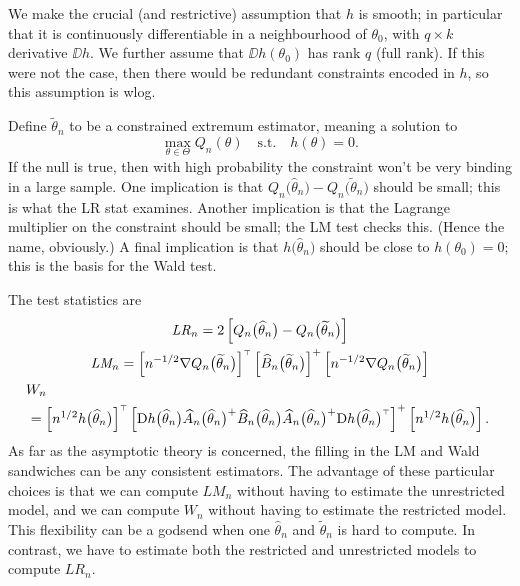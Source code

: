 \documentclass[11pt,letterpaper,reqno,oneside]{article}
\begin{document}
We make the crucial (and restrictive) assumption that $h$ is smooth; in particular that it is continuously differentiable in a neighbourhood of $\theta_0$, with $q \times k$ derivative $\DD h$. We further assume that $\DD h(\theta_0)$ has rank $q$ (full rank). If this were not the case, then there would be redundant constraints encoded in $h$, so this assumption is wlog.

Define $\widetilde{\theta}_n$ to be a constrained extremum estimator, meaning a solution to
%
\begin{equation*}
	\max_{\theta \in \Theta} Q_n(\theta)
	\quad\text{s.t.}\quad 
	h(\theta)=0 .
\end{equation*}
%
If the null is true, then with high probability the constraint won't be very binding in a large sample. One implication is that $Q_n\bigl( \widehat{\theta}_n \bigr) - Q_n\bigl( \widetilde{\theta}_n \bigr)$ should be small; this is what the LR stat examines. Another implication is that the Lagrange multiplier on the constraint should be small; the LM test checks this. (Hence the name, obviously.) A final implication is that $h\bigl( \widehat{\theta}_n \bigr)$ should be close to $h(\theta_0)=0$; this is the basis for the Wald test.


The test statistics are
%
\begin{gather*}
	\mathit{LR}_n
	= 2 \left[ Q_n\bigl( \widehat{\theta}_n \bigr) 
	- Q_n\bigl( \widetilde{\theta}_n \bigr) \right]
	\\
	\textit{LM}_n
	= \left[ n^{-1/2} \nabla Q_n\bigl( \widetilde{\theta}_n \bigr) \right]^{\scriptscriptstyle \top}
	\left[ \widehat{B}_n\bigl( \widetilde{\theta}_n \bigr) \right]^+
	\left[ n^{-1/2} \nabla Q_n\bigl( \widetilde{\theta}_n \bigr) \right]
	\\
	W_n
	\quad\quad\quad\quad\quad\quad\quad\quad\quad\quad\quad\quad\quad
	\quad\quad\quad\quad\quad\quad\quad\quad\quad\quad\quad\quad\quad
	\quad\quad\quad\quad\quad\quad
	\\
	= \left[ n^{1/2} h\bigl( \widehat{\theta}_n \bigr) \right]^{\scriptscriptstyle \top}
	\left[ \mathrm{D} h\bigl( \widehat{\theta}_n \bigr)
	\widehat{A}_n\bigl( \widehat{\theta}_n \bigr)^+
	\widehat{B}_n\bigl( \widehat{\theta}_n \bigr)
	\widehat{A}_n\bigl( \widehat{\theta}_n \bigr)^+
	\mathrm{D} h\bigl( \widehat{\theta}_n \bigr)^{\scriptscriptstyle \top} \right]^+
	\left[ n^{1/2} h\bigl( \widehat{\theta}_n \bigr) \right] .
\end{gather*}
%
As far as the asymptotic theory is concerned, the filling in the LM and Wald sandwiches can be any consistent estimators. The advantage of these particular choices is that we can compute $\textit{LM}_n$ without having to estimate the unrestricted model, and we can compute $W_n$ without having to estimate the restricted model. This flexibility can be a godsend when one $\widehat{\theta}_n$ and $\widetilde{\theta}_n$ is hard to compute. In contrast, we have to estimate both the restricted and unrestricted models to compute $\mathit{LR}_n$.
\end{document}
